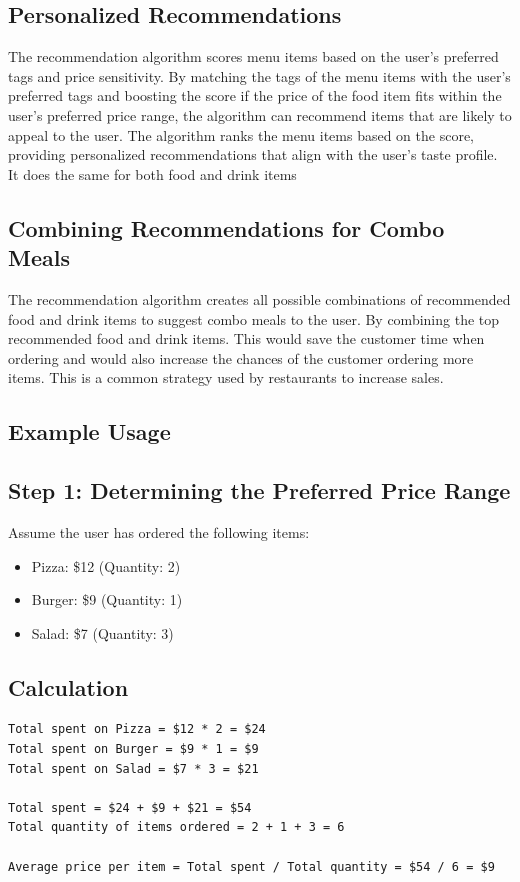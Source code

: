 \subsection{Personalized Recommendations}
The recommendation algorithm scores menu items based on the user's preferred tags and price sensitivity. By matching the tags of the menu items with the user's preferred tags and boosting the score if the price of the food item fits within the user's preferred price range, the algorithm can recommend items that are likely to appeal to the user. The algorithm ranks the menu items based on the score, providing personalized recommendations that align with the user's taste profile. It does the same for both food and drink items

\subsection{Combining Recommendations for Combo Meals}
The recommendation algorithm creates all possible combinations of recommended food and drink items to suggest combo meals to the user. By combining the top recommended food and drink items. This would save the customer time when ordering and would also increase the chances of the customer ordering more items. This is a common strategy used by restaurants to increase sales.

\subsection{Example Usage}
\subsection*{Step 1: Determining the Preferred Price Range}

Assume the user has ordered the following items:

\begin{itemize}
    \item Pizza: \$12 (Quantity: 2)
    \item Burger: \$9 (Quantity: 1)
    \item Salad: \$7 (Quantity: 3)
\end{itemize}

\subsection*{Calculation}

\begin{verbatim}
Total spent on Pizza = $12 * 2 = $24
Total spent on Burger = $9 * 1 = $9
Total spent on Salad = $7 * 3 = $21

Total spent = $24 + $9 + $21 = $54
Total quantity of items ordered = 2 + 1 + 3 = 6

Average price per item = Total spent / Total quantity = $54 / 6 = $9
\end{verbatim}

